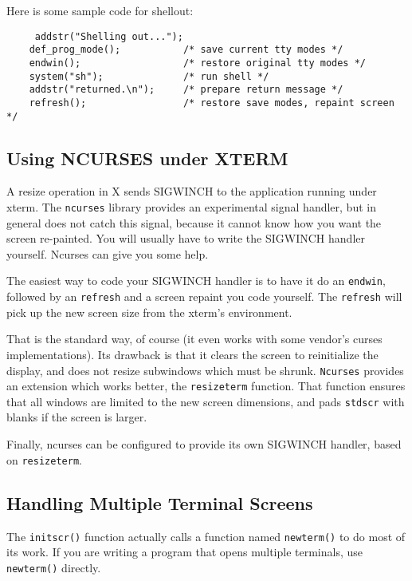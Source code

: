 Here is some sample code for shellout:
\begin{verbatim}     addstr("Shelling out...");
    def_prog_mode();           /* save current tty modes */
    endwin();                  /* restore original tty modes */
    system("sh");              /* run shell */
    addstr("returned.\n");     /* prepare return message */
    refresh();                 /* restore save modes, repaint screen */
\end{verbatim}

\subsection{Using NCURSES under XTERM}

\label{f0:xterm}A resize operation in X sends SIGWINCH to the application running under xterm.
The \texttt{ncurses} library provides an experimental signal
handler, but in general does not catch this signal, because it cannot
know how you want the screen re-painted.  You will usually have to write the
SIGWINCH handler yourself.  Ncurses can give you some help. 

The easiest way to code your SIGWINCH handler is to have it do an
\texttt{endwin}, followed by an \texttt{refresh} and a screen repaint you code
yourself.  The \texttt{refresh} will pick up the new screen size from the
xterm's environment. 

That is the standard way, of course (it even works with some vendor's curses
implementations).
Its drawback is that it clears the screen to reinitialize the display, and does
not resize subwindows which must be shrunk.
\texttt{Ncurses} provides an extension which works better, the
\texttt{resizeterm} function.  That function ensures that all windows
are limited to the new screen dimensions, and pads \texttt{stdscr}
with blanks if the screen is larger. 

Finally, ncurses can be configured to provide its own SIGWINCH handler,
based on \texttt{resizeterm}.

\subsection{Handling Multiple Terminal Screens}

\label{f0:screens}The \texttt{initscr()} function actually calls a function named
\texttt{newterm()} to do most of its work.  If you are writing a program that
opens multiple terminals, use \texttt{newterm()} directly. 

